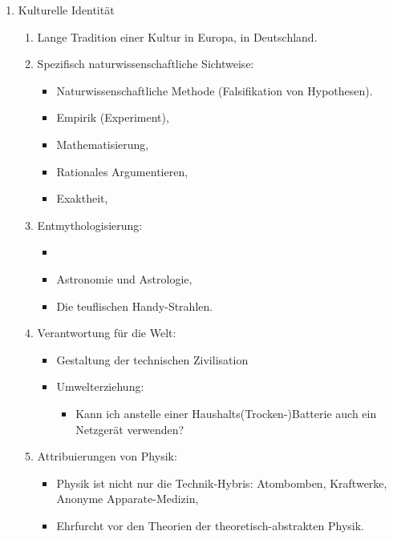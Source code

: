 \begin{enumerate}
	\item Kulturelle Identit\"{a}t

	\begin{enumerate}

		\item Lange Tradition einer Kultur in Europa, in Deutschland.

		\item Spezifisch naturwissenschaftliche Sichtweise:
		\begin{itemize}
			\item Naturwissenschaftliche Methode (Falsifikation von Hypothesen).
			\item Empirik (Experiment),
			\item Mathematisierung,
			\item Rationales Argumentieren,
			\item Exaktheit,
		\end{itemize}

		\item Entmythologisierung:
		\begin{itemize}
			\item {}
			\item Astronomie und Astrologie,
			\item Die teuflischen Handy-Strahlen.
		\end{itemize}

		\item Verantwortung f\"{u}r die Welt:
		\begin{itemize}
			\item Gestaltung der technischen Zivilisation
			\item Umwelterziehung:
			\begin{itemize}
				\item Kann ich anstelle einer Haushalts(Trocken-)Batterie auch ein Netzger\"{a}t verwenden?
			\end{itemize}

		\end{itemize}


		\item Attribuierungen von Physik:
		\begin{itemize}
			\item Physik ist nicht nur die Technik-Hybris: Atombomben, Kraftwerke, Anonyme Apparate-Medizin,
			\item Ehrfurcht vor den Theorien der theoretisch-abstrakten Physik.
		\end{itemize}


\end{enumerate}
\end{enumerate}
